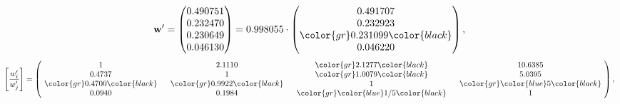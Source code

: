 \begin{example}
\begin{equation*}
\mathbf{w}^{\prime} =
\begin{pmatrix}
0.490751\\
0.232470\\
0.230649\\
0.046130
\end{pmatrix} =
0.998055\cdot
\begin{pmatrix}
0.491707\\
0.232923\\
\color{gr} 0.231099\color{black} \\
0.046220
\end{pmatrix},
\end{equation*}
\begin{equation*}
\left[ \frac{{w}^{\prime}_i}{{w}^{\prime}_j} \right] =
\begin{pmatrix}
$\,\,$ 1 $\,\,$ & $\,\,$2.1110$\,\,$ & $\,\,$\color{gr} 2.1277\color{black} $\,\,$ & $\,\,$10.6385$\,\,$ \\
$\,\,$0.4737$\,\,$ & $\,\,$ 1 $\,\,$ & $\,\,$\color{gr} 1.0079\color{black} $\,\,$ & $\,\,$5.0395  $\,\,$ \\
$\,\,$\color{gr} 0.4700\color{black} $\,\,$ & $\,\,$\color{gr} 0.9922\color{black} $\,\,$ & $\,\,$ 1 $\,\,$ & $\,\,$\color{gr} \color{blue} 5\color{black}  $\,\,$ \\
$\,\,$0.0940$\,\,$ & $\,\,$0.1984$\,\,$ & $\,\,$\color{gr} \color{blue}  1/5\color{black} $\,\,$ & $\,\,$ 1  $\,\,$ \\
\end{pmatrix},
\end{equation*}
\end{example}
\newpage
